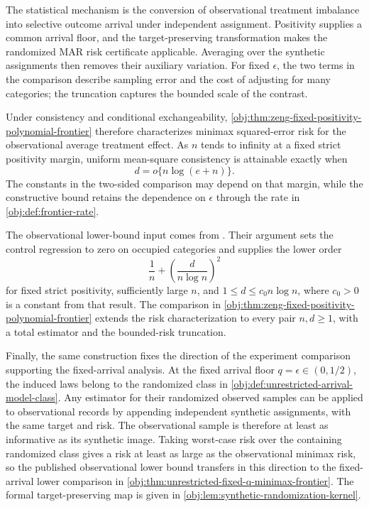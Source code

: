 \documentclass[11pt]{article}
\begin{document}
The statistical mechanism is the conversion of observational treatment imbalance into selective outcome arrival under independent assignment. Positivity supplies a common arrival floor, and the target-preserving transformation makes the randomized MAR risk certificate applicable. Averaging over the synthetic assignments then removes their auxiliary variation. For fixed \(\epsilon\), the two terms in the comparison describe sampling error and the cost of adjusting for many categories; the truncation captures the bounded scale of the contrast.

Under consistency and conditional exchangeability, \cref{obj:thm:zeng-fixed-positivity-polynomial-frontier} therefore characterizes minimax squared-error risk for the observational average treatment effect. As \(n\) tends to infinity at a fixed strict positivity margin, uniform mean-square consistency is attainable exactly when
\[
d=o\{n\log(e+n)\}.
\]
The constants in the two-sided comparison may depend on that margin, while the constructive bound retains the dependence on \(\epsilon\) through the rate in \cref{obj:def:frontier-rate}.

The observational lower-bound input comes from \citet[Theorem~2, Section~3.2, p.~9, together with its proof in Section~C.5, pp.~39--44]{ZengBalakrishnanHanKennedy2026}. Their argument sets the control regression to zero on occupied categories and supplies the lower order
\[
\frac1n+\left(\frac{d}{n\log n}\right)^2
\]
for fixed strict positivity, sufficiently large \(n\), and \(1\le d\le c_0n\log n\), where \(c_0>0\) is a constant from that result. The comparison in \cref{obj:thm:zeng-fixed-positivity-polynomial-frontier} extends the risk characterization to every pair \(n,d\ge1\), with a total estimator and the bounded-risk truncation.

Finally, the same construction fixes the direction of the experiment comparison supporting the fixed-arrival analysis. At the fixed arrival floor \(q=\epsilon\in(0,1/2)\), the induced laws belong to the randomized class in \cref{obj:def:unrestricted-arrival-model-class}. Any estimator for their randomized observed samples can be applied to observational records by appending independent synthetic assignments, with the same target and risk. The observational sample is therefore at least as informative as its synthetic image. Taking worst-case risk over the containing randomized class gives a risk at least as large as the observational minimax risk, so the published observational lower bound transfers in this direction to the fixed-arrival lower comparison in \cref{obj:thm:unrestricted-fixed-q-minimax-frontier}. The formal target-preserving map is given in \cref{obj:lem:synthetic-randomization-kernel}.
\end{document}
